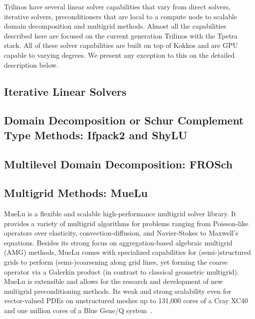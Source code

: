 
Trilinos have several linear solver capabilities that vary from direct solvers, iterative solvers, preconditioners that are local to a compute node to scalable domain decomposition and multigrid methods. Almost all the capabilities described here are focused on the current generation Trilinos with the Tpetra stack. All of these solver capabilities are built on top of Kokkos and are GPU capable to varying degrees. We present any exception to this on the detailed description below.

\subsection{Iterative Linear Solvers}


\subsection{Domain Decomposition or Schur Complement Type Methods: Ifpack2 and ShyLU}


\subsection{Multilevel Domain Decomposition: FROSch}


\subsection{Multigrid Methods: MueLu}

MueLu is a flexible and scalable high-performance multigrid solver library.
It provides a variety of multigrid algorithms for problems ranging from Poisson-like operators over elasticity, convection-diffusion, and Navier-Stokes to Maxwell’s equations.
Besides its strong focus on aggregation-based algebraic multigrid (AMG) methods,
MueLu comes with specialized capabilities for (semi-)structured grids to perform (semi-)coarsening along grid lines,
yet forming the coarse operator via a Galerkin product (in contrast to classical geometric multigrid).
MueLu is extensible and allows for the research and development of new multigrid preconditioning methods.
Its weak and strong scalability even for vector-valued PDEs on unstructured meshes
up to 131,000 cores of a Cray XC40 and one million cores of a Blue Gene/Q system~\cite{Lin2017a,Thomas2019a}. 

